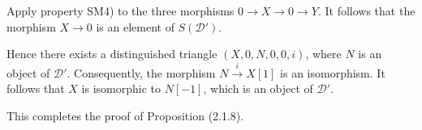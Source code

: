 Apply property SM4) to the three morphisms $0\to X\to 0\to Y$.
%
It follows
that the morphism $X\to 0$ is an element of $S(\mathcal D')$.

Hence there exists a distinguished triangle $(X,0,N,0,0,i)$, where $N$ is an
object of $\mathcal D'$.
%
Consequently, the morphism
$N\xrightarrow{i}X[1]$ is an isomorphism. It follows that $X$ is isomorphic
to $N[-1]$, which is an object of $\mathcal D'$.

This completes the proof of Proposition (2.1.8).

\endgroup
